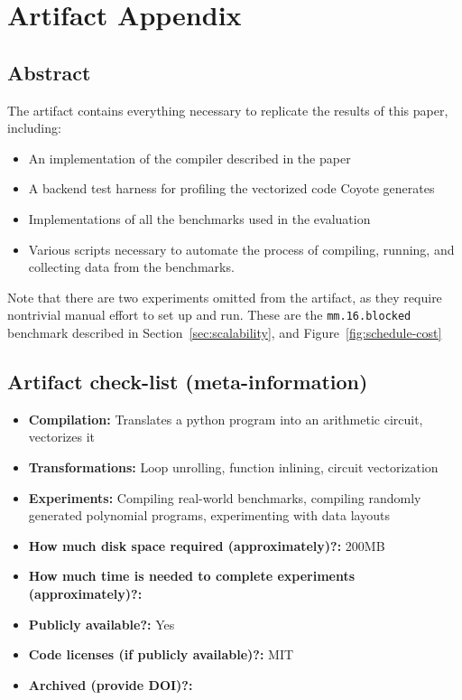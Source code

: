 \section{Artifact Appendix}

\subsection{Abstract}

The artifact contains everything necessary to replicate the results of this paper, including:
\begin{itemize}
    \item An implementation of the compiler described in the paper
    \item A backend test harness for profiling the vectorized code Coyote generates
    \item Implementations of all the benchmarks used in the evaluation
    \item Various scripts necessary to automate the process of compiling, running, and collecting data from the benchmarks.
\end{itemize}

Note that there are two experiments omitted from the artifact, as they require nontrivial manual effort to set up and run. These are the {\tt mm.16.blocked} benchmark described in Section~\ref{sec:scalability}, and Figure~\ref{fig:schedule-cost}

\subsection{Artifact check-list (meta-information)}

{\small
\begin{itemize}
  \item {\bf Compilation: } Translates a python program into an arithmetic circuit, vectorizes it
  \item {\bf Transformations: } Loop unrolling, function inlining, circuit vectorization
  \item {\bf Experiments: } Compiling real-world benchmarks, compiling randomly generated polynomial programs, experimenting with data layouts
  \item {\bf How much disk space required (approximately)?: } 200MB
  \item {\bf How much time is needed to complete experiments (approximately)?: }
  \item {\bf Publicly available?: } Yes
  \item {\bf Code licenses (if publicly available)?: } MIT
  \item {\bf Archived (provide DOI)?: }
\end{itemize}
}

